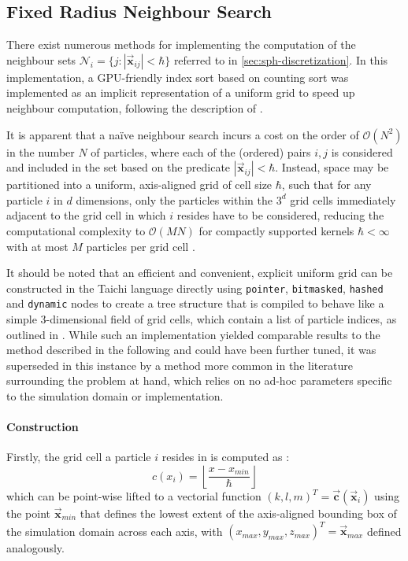 \documentclass[oneside, a4paper]{book}
\newcommand\abs[1]{\left|#1\right|}
\newcommand\vek[1]{\vec{\bm{#1}}}
\newcommand\br[1]{\left(#1\right)}
\begin{document}
\begin{appendices}
    \chapter{Fixed Radius Neighbour Search}\label{appendix:fixed-radius-neighbour-search}
    There exist numerous methods for implementing the computation of the neighbour sets $\mathcal{N}_i = \{j : \abs{\vek{x}_{ij}}<\hbar\}$ referred to in \autoref{sec:sph-discretization}. In this implementation, a GPU-friendly index sort based on counting sort was implemented as an implicit representation of a uniform grid to speed up neighbour computation, following the description of \autocite[Hoetzlein]{hoetzlein-rama-counting-sort}. 

    It is apparent that a na\"ive neighbour search incurs a cost on the order of $\mathcal{O}\br{N^2}$ in the number $N$ of particles, where each of the (ordered) pairs $i,j$ is considered and included in the set based on the predicate $\abs{\vek{x}_{ij}}<\hbar$. Instead, space may be partitioned into a uniform, axis-aligned grid of cell size $\hbar$, such that for any particle $i$ in $d$ dimensions, only the particles within the $3^d$ grid cells immediately adjacent to the grid cell in which $i$ resides have to be considered, reducing the computational complexity to $\mathcal{O}(MN)$ for compactly supported kernels $\hbar<\infty$ with at most $M$ particles per grid cell \autocite{tutorial2019}. 
    
    It should be noted that an efficient and convenient, explicit uniform grid can be constructed in the Taichi language directly using \texttt{pointer}, \texttt{bitmasked}, \texttt{hashed} and \texttt{dynamic} nodes to create a tree structure that is compiled to behave like a simple 3-dimensional field of grid cells, which contain a list of particle indices, as outlined in \cite[this paper]{taichi-sparse}. While such an implementation yielded comparable results to the method described in the following and could have been further tuned, it was superseded in this instance by a method more common in the literature surrounding the problem at hand, which relies on no ad-hoc parameters specific to the simulation domain or implementation.

    \subsubsection{Construction}
    Firstly,  the grid cell a particle $i$ resides in is computed as \autocite{compressed-neighbour-lists}:
    \begin{equation}
      c(x_i) =  \left\lfloor\frac{x-x_{min}}{\hbar}\right\rfloor
    \end{equation}
    which can be point-wise lifted to a vectorial function $(k,l,m)^T = \vek{c}\br{\vek{x}_i}$ using the point $\vek{x}_{min}$ that defines the lowest extent of the axis-aligned bounding box of the simulation domain across each axis, with $(x_{max}, y_{max}, z_{max})^T = \vek{x}_{max}$ defined analogously. 
    

\end{appendices}
\end{document}
